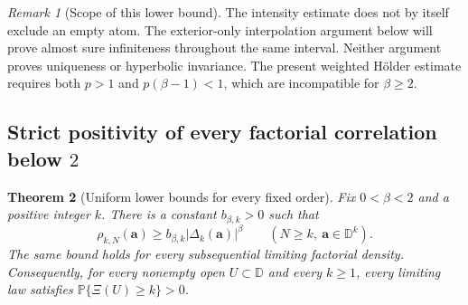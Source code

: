 \documentclass[11pt,a4paper]{article}
\numberwithin{equation}{section}
\newtheorem{theorem}{Theorem}[section]
\theoremstyle{definition}
\theoremstyle{remark}
\newtheorem{remark}[theorem]{Remark}
\newcommand{\D}{\mathbb D}
\begin{document}
\begin{remark}[Scope of this lower bound]
The intensity estimate does not by itself exclude an empty atom.
The exterior-only interpolation argument below will prove almost sure
infiniteness throughout the same interval. Neither argument proves
uniqueness or hyperbolic invariance. The present weighted H\"older
estimate requires both $p>1$ and $p(\beta-1)<1$, which are
incompatible for $\beta\ge2$.
\end{remark}

\subsection{Strict positivity of every factorial correlation below \texorpdfstring{$2$}{2}}

\begin{theorem}[Uniform lower bounds for every fixed order]
\label{thm:nonemptiness-all-orders-below-two}
Fix $0<\beta<2$ and a positive integer $k$. There is a constant
$b_{\beta,k}>0$ such that
\begin{equation}
 \rho_{k,N}(\mathbf a)\ge
 b_{\beta,k}|\Delta_k(\mathbf a)|^\beta
 \qquad(N\ge k,\ \mathbf a\in\D^k).
 \label{eq:nonemptiness-all-orders-below-two}
\end{equation}
The same bound holds for every subsequential limiting factorial
density. Consequently, for every nonempty open $U\subset\D$ and
every $k\ge1$, every limiting law satisfies
$\mathbb P\{\Xi(U)\ge k\}>0$.
\end{theorem}
\end{document}
